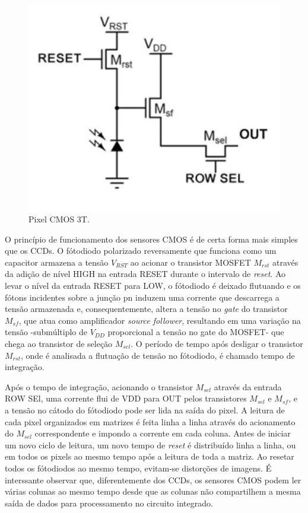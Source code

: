 \documentclass[10pt,a4paper,twocolumn]{article}
\begin{document}
	\begin{figure}[!h]
		\centering
		\includegraphics[scale=0.12]{imagens/cmos_3t.jpg}
		\caption{Pixel CMOS 3T.}
	\end{figure}
	
	O princípio de funcionamento dos sensores CMOS é de certa forma mais simples que os CCDs. O fótodiodo polarizado reversamente que funciona como um capacitor armazena a tensão $V_{RST}$ ao acionar o transistor MOSFET $M_{rst}$ através da adição de nível HIGH na entrada RESET durante o intervalo de \textit{reset}. Ao levar o nível da entrada RESET para LOW, o fótodiodo é deixado flutuando e os fótons incidentes sobre a junção pn induzem uma corrente que descarrega a tensão armazenada e, consequentemente, altera a tensão no \textit{gate} do transistor $M_{sf}$, que atua como amplificador \textit{source follower}, resultando em uma variação na tensão -submúltiplo de $V_{DD}$ proporcional a tensão no gate do MOSFET- que chega ao transistor de seleção $M_{sel}$. O período de tempo após desligar o transistor $M_{rst}$, onde é analisada a flutuação de tensão no fótodiodo, é chamado tempo de integração.
	
	Após o tempo de integração, acionando o transistor $M_{sel}$ através da entrada ROW SEl, uma corrente flui de VDD para OUT pelos transistores $M_{sel}$ e $M_{sf}$, e a tensão no cátodo do fótodiodo pode ser lida na saída do pixel. A leitura de cada pixel organizados em matrizes é feita linha a linha através do acionamento do $M_{sel}$ correspondente e impondo a corrente em cada coluna. Antes de iniciar um novo ciclo de leitura, um novo tempo de \textit{reset} é distribuído linha a linha, ou em todos os pixels ao mesmo tempo após a leitura de toda a matriz. Ao resetar todos os fótodiodos ao mesmo tempo, evitam-se distorções de imagens. É interssante observar que, diferentemente dos CCDs, os sensores CMOS podem ler várias colunas ao mesmo tempo desde que as colunas não compartilhem a mesma saída de dados para processamento no circuito integrado.
	
\end{document}
